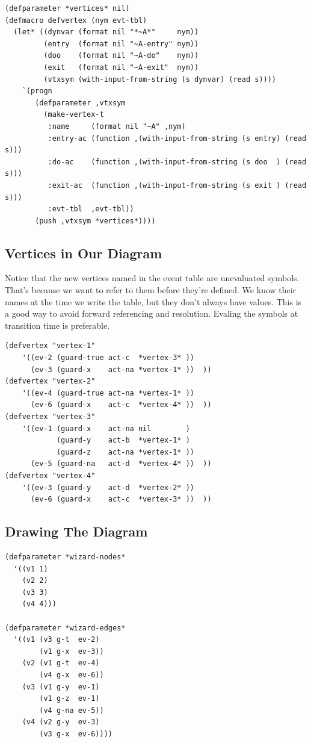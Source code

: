 \documentclass[10pt,oneside,x11names]{article}
\begin{document}
\begin{verbatim}
(defparameter *vertices* nil)
(defmacro defvertex (nym evt-tbl)
  (let* ((dynvar (format nil "*~A*"     nym))
         (entry  (format nil "~A-entry" nym))
         (doo    (format nil "~A-do"    nym))
         (exit   (format nil "~A-exit"  nym))
         (vtxsym (with-input-from-string (s dynvar) (read s))))
    `(progn
       (defparameter ,vtxsym
         (make-vertex-t
          :name     (format nil "~A" ,nym)
          :entry-ac (function ,(with-input-from-string (s entry) (read s)))
          :do-ac    (function ,(with-input-from-string (s doo  ) (read s)))
          :exit-ac  (function ,(with-input-from-string (s exit ) (read s)))
          :evt-tbl  ,evt-tbl))
       (push ,vtxsym *vertices*))))
\end{verbatim}

\subsection{Vertices in Our Diagram}
\label{sec:org0c5ac10}

Notice that the new vertices named in the event table are unevaluated symbols.
That's because we want to refer to them before they're defined. We know their
names at the time we write the table, but they don't always have values. This
is a good way to avoid forward referencing and resolution. Evaling the symbols
at transition time is preferable.

\begin{verbatim}
(defvertex "vertex-1"
    '((ev-2 (guard-true act-c  *vertex-3* ))
      (ev-3 (guard-x    act-na *vertex-1* ))  ))
(defvertex "vertex-2"
    '((ev-4 (guard-true act-na *vertex-1* ))
      (ev-6 (guard-x    act-c  *vertex-4* ))  ))
(defvertex "vertex-3"
    '((ev-1 (guard-x    act-na nil        )
            (guard-y    act-b  *vertex-1* )
            (guard-z    act-na *vertex-1* ))
      (ev-5 (guard-na   act-d  *vertex-4* ))  ))
(defvertex "vertex-4"
    '((ev-3 (guard-y    act-d  *vertex-2* ))
      (ev-6 (guard-x    act-c  *vertex-3* ))  ))
\end{verbatim}

\subsection{Drawing The Diagram}
\label{sec:org9316ce3}

\begin{verbatim}
(defparameter *wizard-nodes*
  '((v1 1)
    (v2 2)
    (v3 3)
    (v4 4)))

(defparameter *wizard-edges*
  '((v1 (v3 g-t  ev-2)
        (v1 g-x  ev-3))
    (v2 (v1 g-t  ev-4)
        (v4 g-x  ev-6))
    (v3 (v1 g-y  ev-1)
        (v1 g-z  ev-1)
        (v4 g-na ev-5))
    (v4 (v2 g-y  ev-3)
        (v3 g-x  ev-6))))
\end{verbatim}
\end{document}
